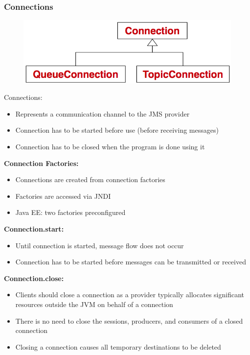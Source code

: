 \documentclass[10pt]{article}
\begin{document}
\subsubsection{Connections}
\begin{figure}
	\centering
	\includegraphics[scale=0.2]{jms-api-connection.png}%
\end{figure}
Connections:
\begin{itemize}
	\item Represents a communication channel to the JMS provider
	\item Connection has to be started before use (before receiving messages)
	\item Connection has to be closed when the program is done using it
\end{itemize}
\textbf{Connection Factories:}
\begin{itemize}
	\item Connections are created from connection factories
	\item Factories are accessed via JNDI	
	\item Java EE: two factories preconfigured
\end{itemize}
\textbf{Connection.start:}
\begin{itemize}
	\item Until connection is started, message flow does not occur
	\item Connection has to be started before messages can be transmitted or received
\end{itemize}
\textbf{Connection.close:}
\begin{itemize}
	\item Clients should close a connection as a provider typically allocates significant resources outside the JVM on behalf of a connection
	\item There is no need to close the sessions, producers, and consumers of a closed connection
	\item Closing a connection causes all temporary destinations to be deleted
\end{itemize}
\end{document}
